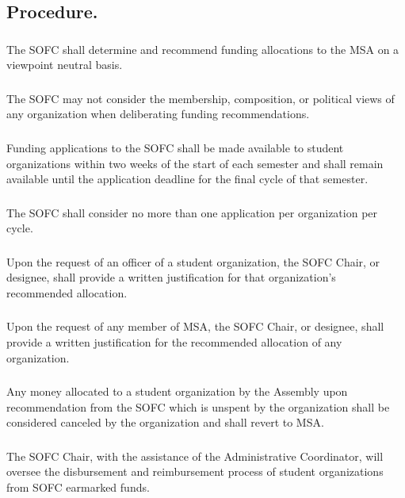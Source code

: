 \subsection{Procedure.}
\subsubsection{}
The SOFC shall determine and recommend funding allocations to the MSA on a viewpoint neutral basis.
\subsubsection{}
The SOFC may not consider the membership, composition, or political views of any organization when deliberating funding recommendations.
\subsubsection{}
Funding applications to the SOFC shall be made available to student organizations within two weeks of the start of each semester and shall remain available until the application deadline for the final cycle of that semester.
\subsubsection{}
The SOFC shall consider no more than one application per organization per cycle.
\subsubsection{}
Upon the request of an officer of a student organization, the SOFC Chair, or designee, shall provide a written justification for that organization's recommended allocation.
\subsubsection{}
Upon the request of any member of MSA, the SOFC Chair, or designee, shall provide a written justification for the recommended allocation of any organization.
\subsubsection{}
Any money allocated to a student organization by the Assembly upon recommendation from the SOFC which is unspent by the organization shall be considered canceled by the organization and shall revert to MSA.
\subsubsection{}
The SOFC Chair, with the assistance of the Administrative Coordinator, will oversee the disbursement and reimbursement process of student organizations from SOFC earmarked funds.

